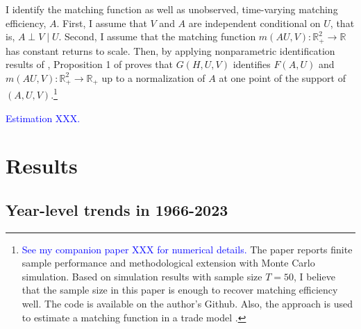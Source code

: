 \documentclass[12pt]{article}
\begin{document}
I identify the matching function as well as unobserved, time-varying matching efficiency, $A .$ 
First, I assume that $V$ and $A$ are independent conditional on $U$, that is, $A \perp V \mid U$. 
Second, I assume that the matching function $m(AU,V):\mathbb{R}_{+}^2 \rightarrow \mathbb{R}$ has constant returns to scale. 
Then, by applying nonparametric identification results of \cite{matzkin2003nonparametric}, Proposition 1 of \cite{lange2020beyond} proves that $G(H, U, V)$ identifies $F(A, U)$ and $m(A U, V): \mathbb{R}_{+}^2 \rightarrow \mathbb{R}_{+}$ up to a normalization of $A$ at one point of the support of $(A, U, V)$.\footnote{\textcolor{blue}{See my companion paper XXX for numerical details.} The paper reports finite sample performance and methodological extension with Monte Carlo simulation. Based on simulation results with sample size $T=50$, I believe that the sample size in this paper is enough to recover matching efficiency well. The code is available on the author's Github. Also, the approach is used to estimate a matching function in a trade model \citep{brancaccio2020geography}.}

\textcolor{blue}{Estimation XXX.}




\section{Results}

\subsection{Year-level trends in 1966-2023}
\end{document}
